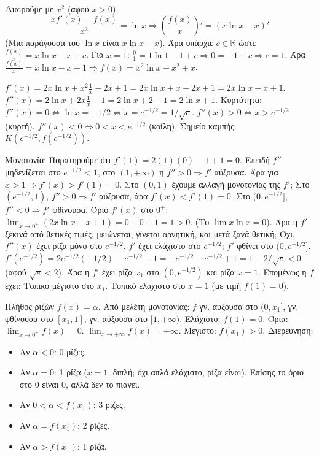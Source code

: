 \documentclass[11pt,a4paper,modern,B]{FFExam}
\begin{document}
\begin{thema}
\begin{erwthma}
\item Διαιρούμε με $x^2$ (αφού $x>0$):
$$ \dfrac{x f'(x) - f(x)}{x^2} = \ln x \Rightarrow \left( \dfrac{f(x)}{x} \right)' = (x \ln x - x)' $$
(Mια παράγουσα του $\ln x$ είναι $x \ln x - x$).
Άρα υπάρχιε $c \in \mathbb{R}$ ώστε $\frac{f(x)}{x} = x \ln x - x + c$.
Για $x=1$: $\frac{0}{1} = 1 \ln 1 - 1 + c \Rightarrow 0 = -1 + c \Rightarrow c = 1$.
Άρα $\frac{f(x)}{x} = x \ln x - x + 1 \Rightarrow \boxed{f(x) = x^2 \ln x - x^2 + x}$.

\item $f'(x) = 2x \ln x + x^2 \frac{1}{x} - 2x + 1 = 2x \ln x + x - 2x + 1 = 2x \ln x - x + 1$.
$f''(x) = 2 \ln x + 2x \frac{1}{x} - 1 = 2 \ln x + 2 - 1 = 2 \ln x + 1$.
Κυρτότητα:
$f''(x) = 0 \Leftrightarrow \ln x = -1/2 \Leftrightarrow x = e^{-1/2} = 1/\sqrt{e}$.
$f''(x) > 0 \Leftrightarrow x > e^{-1/2}$ (κυρτή).
$f''(x) < 0 \Leftrightarrow 0 < x < e^{-1/2}$ (κοίλη).
Σημείο καμπής: $K(e^{-1/2}, f(e^{-1/2}))$.

Μονοτονία:
Παρατηρούμε ότι $f'(1) = 2(1)(0) - 1 + 1 = 0$.
Επειδή $f''$ μηδενίζεται στο $e^{-1/2} < 1$, στο $(1, +\infty)$ η $f'' > 0 \Rightarrow f'$ αύξουσα. Άρα για $x > 1 \Rightarrow f'(x) > f'(1) = 0$.
Στο $(0, 1)$ έχουμε αλλαγή μονοτονίας της $f'$;
Στο $(e^{-1/2}, 1)$, $f'' > 0 \Rightarrow f'$ αύξουσα, άρα $f'(x) < f'(1) = 0$.
Στο $(0, e^{-1/2}]$, $f'' < 0 \Rightarrow f'$ φθίνουσα.
Όριο $f'(x)$ στο $0^+$: $\lim_{x \to 0^+} (2x \ln x - x + 1) = 0 - 0 + 1 = 1 > 0$.
(Το $\lim x \ln x = 0$).
Άρα η $f'$ ξεκινά από θετικές τιμές, μειώνεται, γίνεται αρνητική, και μετά ξανά θετική; Όχι.
$f''(x)$ έχει ρίζα μόνο στο $e^{-1/2}$.
$f'$ έχει ελάχιστο στο $e^{-1/2}$;
$f'$ φθίνει στο $(0, e^{-1/2}]$. $f'(e^{-1/2}) = 2 e^{-1/2} (-1/2) - e^{-1/2} + 1 = -e^{-1/2} - e^{-1/2} + 1 = 1 - 2/\sqrt{e} < 0$ (αφού $\sqrt{e} < 2$).
Άρα η $f'$ έχει ρίζα $x_1$ στο $(0, e^{-1/2})$ και ρίζα $x=1$.
Επομένως η $f$ έχει:
Τοπικό μέγιστο στο $x_1$.
Τοπικό ελάχιστο στο $x=1$ (με τιμή $f(1)=0$).

\item Πλήθος ριζών $f(x) = \alpha$.
Από μελέτη μονοτονίας:
$f$ γν. αύξουσα στο $(0, x_1]$, γν. φθίνουσα στο $[x_1, 1]$, γν. αύξουσα στο $[1, +\infty)$.
Ελάχιστο: $f(1) = 0$.
Όρια: $\lim_{x \to 0^+} f(x) = 0$. $\lim_{x \to +\infty} f(x) = +\infty$.
Μέγιστο: $f(x_1) > 0$.
Διερεύνηση:
\begin{itemize}
    \item Αν $\alpha < 0$: 0 ρίζες.
    \item Αν $\alpha = 0$: 1 ρίζα ($x=1$, διπλή; όχι απλά ελάχιστο, ρίζα είναι). Επίσης το όριο στο 0 είναι 0, αλλά δεν το πιάνει.
    \item Αν $0 < \alpha < f(x_1)$: 3 ρίζες.
    \item Αν $\alpha = f(x_1)$: 2 ρίζες.
    \item Αν $\alpha > f(x_1)$: 1 ρίζα.
\end{itemize}


\end{erwthma}
\end{thema}
\end{document}
